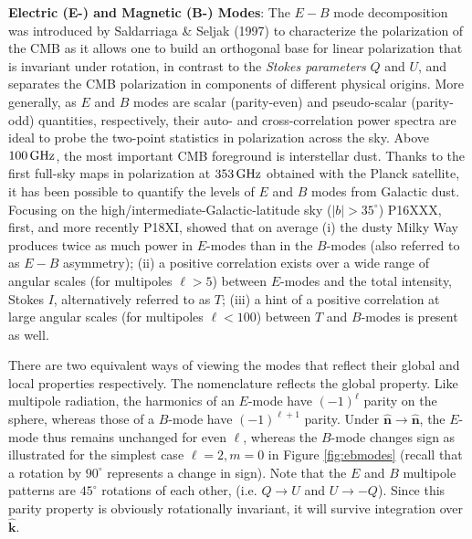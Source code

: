 \documentclass[a4paper,10pt]{article}
\begin{document}
{\noindent}\textbf{Electric (E-) and Magnetic (B-) Modes}: The $E-B$ mode decomposition was introduced by Saldarriaga \& Seljak (1997) to characterize the polarization of the CMB as it allows one to build an orthogonal base for linear polarization that is invariant under rotation, in contrast to the \textit{Stokes parameters} $Q$ and $U$, and separates the CMB polarization in components of different physical origins. More generally, as $E$ and $B$ modes are scalar (parity-even) and pseudo-scalar (parity-odd) quantities, respectively, their auto- and cross-correlation power spectra are ideal to probe the two-point statistics in polarization across the sky. Above $100\,{\rm GHz}$, the most important CMB foreground is interstellar dust. Thanks to the first full-sky maps in polarization at $353\,{\rm GHz}$ obtained with the Planck satellite, it has been possible to quantify the levels of $E$ and $B$ modes from Galactic dust. Focusing on the high/intermediate-Galactic-latitude sky ($|b|>35^\circ$) P16XXX, first, and more recently P18XI, showed that on average (i) the dusty Milky Way produces twice as much power in $E$-modes than in the $B$-modes (also referred to as $E-B$ asymmetry); (ii) a positive correlation exists over a wide range of angular scales (for multipoles $\ell>5$) between $E$-modes and the total intensity, Stokes $I$, alternatively referred to as $T$; (iii) a hint of a positive correlation at large angular scales (for multipoles $\ell<100$) between $T$ and $B$-modes is present as well.

{\noindent}There are two equivalent ways of viewing the modes that reflect their global and local properties respectively. The nomenclature reflects the global property. Like multipole radiation, the harmonics of an $E$-mode have $(-1)^\ell$ parity on the sphere, whereas those of a $B$-mode have $(-1)^{\ell+1}$ parity. Under $\bm{\hat{n}}\rightarrow\bm{\hat{n}}$, the $E$-mode thus remains unchanged for even $\ell$, whereas the $B$-mode changes sign as illustrated for the simplest case $\ell=2,m=0$ in Figure \ref{fig:ebmodes} (recall that a rotation by $90^\circ$ represents a change in sign). Note that the $E$ and $B$ multipole patterns are $45^\circ$ rotations of each other, (i.e. $Q\rightarrow U$ and $U\rightarrow-Q$). Since this parity property is obviously rotationally invariant, it will survive integration over $\bm{\hat{k}}$.
\end{document}
